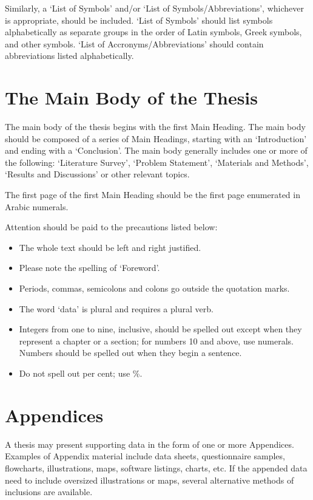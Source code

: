\documentclass[a4paper,oneside,12pt]{report}
\numberwithin{equation}{chapter}
\begin{document}
Similarly, a `List of Symbols' and/or `List of Symbols/Abbreviations', whichever is
appropriate, should be included. `List of Symbols' should list symbols alphabetically as separate groups in the order of Latin symbols, Greek symbols, and other symbols. `List of Accronyms/Abbreviations' should contain abbreviations listed alphabetically.

\section{The Main Body of the Thesis}
The main body of the thesis begins with the first Main Heading. The main body
should be composed of a series of Main Headings, starting with an
`Introduction' and ending with a `Conclusion'. The
main body generally includes one or more of the following: `Literature Survey', `Problem Statement', `Materials and Methods', `Results and Discussions' or other relevant topics.

The first page of the first Main Heading should be the first page
enumerated in Arabic numerals. 

Attention should be paid to the precautions listed below:

\begin{itemize}
\item The whole text should be left and right justified.
\item Please note the spelling of `Foreword'.
\item Periods, commas, semicolons and colons go outside the quotation
marks.
\item The word `data' is plural and requires a plural verb.
\item Integers from one to nine, inclusive, should be spelled out
except when they represent a chapter or a section; for numbers 10 and
above, use numerals. Numbers should be spelled out when they begin a
sentence.
\item Do not spell out per cent; use \%.
\end{itemize}


\section{Appendices}
A thesis may present supporting data in the form of one or more Appendices. Examples of Appendix material include data sheets, questionnaire samples, flowcharts, illustrations, maps,
software listings, charts, etc. If the appended data need to include
oversized illustrations or maps, several alternative methods of
inclusions are available.
\end{document}

